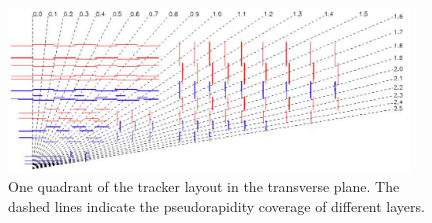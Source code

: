 \begin{figure}
	\centering
	\includegraphics[width=0.95\textwidth]{detector/figs/trackerTransverse}
	\renewcommand{\baselinestretch}{1.0}
	\caption[One quadrant of the tracker layout in the transverse plane.]{One quadrant of the tracker layout in the transverse plane. The dashed lines indicate the pseudorapidity coverage of different layers.}
	\label{fig:pixelTransverse}
\end{figure}

